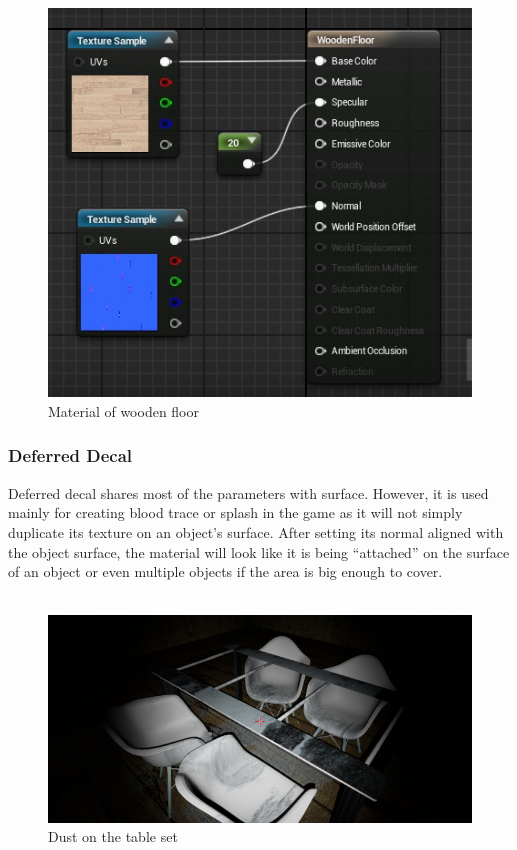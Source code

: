 \documentclass{article}
\begin{document}
\begin{figure}[h]
\centering
\includegraphics[scale=0.6]{material1.jpg}
\caption{Material of wooden floor}
\label{fig:material1}
\end{figure}

\clearpage

\subsubsection{Deferred Decal}
Deferred decal shares most of the parameters with surface. However, it is used mainly for creating blood trace or splash in the game as it will not simply duplicate its texture on an object’s surface. After setting its normal aligned with the object surface, the material will look like it is being “attached” on the surface of an object or even multiple objects if the area is big enough to cover.\\ \\
\begin{figure}[h]
\centering
\includegraphics[scale=0.6]{material2.png}
\caption{Dust on the table set}
\label{fig:material2}
\end{figure}
\end{document}
